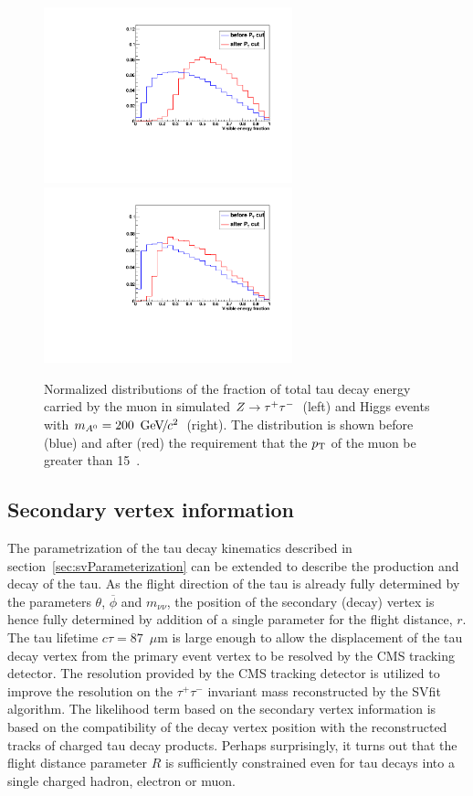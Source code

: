 \begin{figure}[t]
\begin{center}
\includegraphics*[width=72mm]{svfit_chapter/figures/scuplting_Ztautau_powheg_muon.pdf}
\includegraphics*[width=72mm]{svfit_chapter/figures/scuplting_A200_muon.pdf}
\caption[Effect of the visible \pt requirements for $Z$ and Higgs
events]{\captiontext Normalized distributions of the fraction of total tau decay
energy carried by the muon in simulated $Z\to\tau^+\tau^-$~(left) and Higgs events with
\mbox{$m_{A^0} = 200~{\,\text{Ge\hspace{-.08em}V\hspace{-0.16em}/\hspace{-0.08em}}c^\text{2}}$}~(right).   The distribution is shown before (blue) and
after (red) the requirement that the $p_{\mathrm{T}}$ of the muon be greater than
15~\GeVc.} \label{fig:ptBalancePtVisCutsCompareMasses}
\end{center}
\end{figure} 

\subsection{Secondary vertex information} 

The parametrization of the tau decay kinematics described in
section~\ref{sec:svParameterization} can be extended to describe the production
and decay of the tau.  As the flight direction of the tau is already fully
determined by the parameters $\theta$, $\overline{\phi}$ and $m_{\nu\nu}$, the
position of the secondary (decay) vertex is hence fully determined by addition
of a single parameter for the flight distance, $r$.  The tau lifetime $c\tau =
87$~$\mu$m is large enough to allow the displacement of the tau decay vertex
from the primary event vertex to be resolved by the CMS tracking detector.  The
resolution provided by the CMS tracking detector is utilized to improve the
resolution on the $\tau^{+} \tau^{-}$ invariant mass reconstructed by the SVfit
algorithm.  The likelihood term based on the secondary vertex information is
based on the compatibility of the decay vertex position with the reconstructed
tracks of charged tau decay products.  Perhaps surprisingly, it turns out that
the flight distance parameter $R$ is sufficiently constrained even for tau
decays into a single charged hadron, electron or muon.

